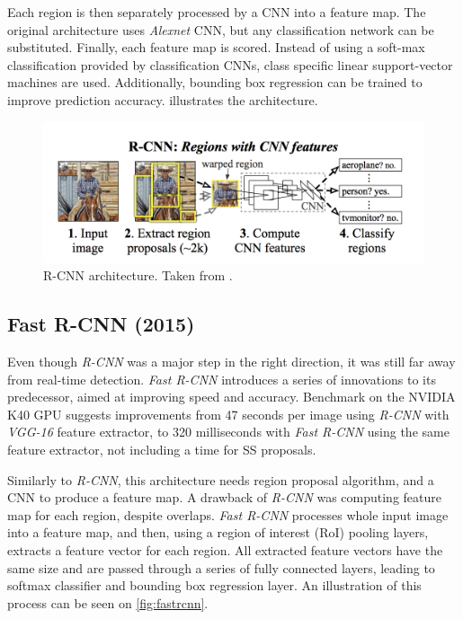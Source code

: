 Each region is then separately processed by a CNN into a feature map. The original architecture uses \textit{Alexnet} CNN, but any classification network can be substituted. Finally, each feature map is scored. Instead of using a soft-max classification provided by classification CNNs, class specific linear support-vector machines are used. Additionally, bounding box regression can be trained to improve prediction accuracy.  illustrates the architecture.

\begin{figure}
    \centering
    \includegraphics[width=\textwidth]{img/rcnn}
    \caption{R-CNN architecture. Taken from \cite[fig. 1]{bib:rcnn}.}
    \label{fig:rcnn}
\end{figure}

\subsection{Fast R-CNN (2015)}
Even though \textit{R-CNN} was a major step in the right direction, it was still far away from real-time detection. \textit{Fast R-CNN} \cite{bib:fastrcnn} introduces a series of innovations to its predecessor, aimed at improving speed and accuracy. Benchmark on the NVIDIA K40 GPU suggests improvements from 47 seconds per image using \textit{R-CNN} with \textit{VGG-16} feature extractor, to 320 milliseconds with \textit{Fast R-CNN} using the same feature extractor, not including a time for SS proposals. 

Similarly to \textit{R-CNN}, this architecture needs region proposal algorithm, and a CNN to produce a feature map. A drawback of \textit{R-CNN} was computing feature map for each region, despite overlaps. \textit{Fast R-CNN} processes whole input image into a feature map, and then, using a region of interest (RoI) pooling layers, extracts a feature vector for each region. All extracted feature vectors have the same size and are passed through a series of fully connected layers, leading to softmax classifier and bounding box regression layer. An illustration of this process can be seen on \cref{fig:fastrcnn}.

